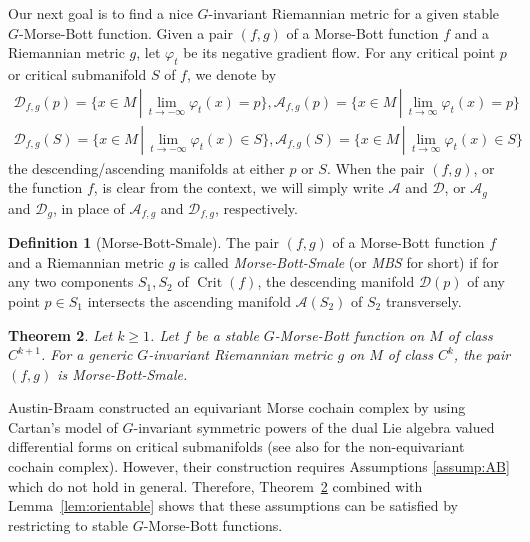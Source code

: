 \documentclass[11pt]{amsart}
\newtheorem{theorem}{Theorem}[section]
\theoremstyle{definition}
\newtheorem{definition}[theorem]{Definition}
\numberwithin{equation}{subsection}
\DeclareMathOperator{\crit}{Crit}
\newcommand{\des}{\mathscr{D}}
\newcommand{\asc}{\mathscr{A}}
\begin{document}
Our next goal is to find a nice $G$-invariant Riemannian metric for a given stable $G$-Morse-Bott function. Given a pair $(f,g)$ of a Morse-Bott function $f$ and a Riemannian metric $g$, let $\varphi_t$ be its negative gradient flow. For any critical point $p$ or critical submanifold $S$ of $f$, we denote by
\begin{align*}
    \des_{f,g}(p)=\{x\in M\,|\,\lim_{t\rightarrow-\infty}\varphi_t(x)=p\},\asc_{f,g}(p)=\{x\in M\,|\,\lim_{t\rightarrow\infty}\varphi_t(x)=p\}\\
     \des_{f,g}(S)=\{x\in M\,|\,\lim_{t\rightarrow-\infty}\varphi_t(x)\in S\}, \asc_{f,g}(S)=\{x\in M\,|\,\lim_{t\rightarrow\infty}\varphi_t(x)\in S\}
\end{align*}
the descending/ascending manifolds at either $p$ or $S$. When the pair $(f,g)$, or the function $f$, is clear from the context, we will simply write $\asc$ and $\des$, or $\asc_g$ and $\des_g$, in place of $\asc_{f,g}$ and $\des_{f,g}$, respectively.



\begin{definition}[Morse-Bott-Smale]\label{def:MBS}
    The pair $(f,g)$ of a Morse-Bott function $f$ and a Riemannian metric $g$ is called \emph{Morse-Bott-Smale} (or  \emph{MBS} for short) if for any two components $S_1,S_2$ of $\crit(f)$, the descending manifold $\des(p)$ of any point $p\in S_1$ intersects the ascending manifold $\asc(S_2)$ of $S_2$ transversely.
\end{definition}

\begin{theorem}\label{thm:Morse-Bott-Smale-is-generic}
    Let $k \geq 1$. Let $f$ be a stable $G$-Morse-Bott function on $M$ of class $C^{k+1}$. 
    For a generic $G$-invariant Riemannian metric $g$ on $M$ of class $C^k$, the pair $(f,g)$ is Morse-Bott-Smale.
\end{theorem}

Austin-Braam \cite{AustinBraam} constructed an equivariant Morse cochain complex by using Cartan's model of $G$-invariant symmetric powers of the dual Lie algebra valued differential forms on critical submanifolds (see also \cite{zhuang2025analytictopologicalrealizationsinvariant} for the non-equivariant cochain complex). However, their construction requires Assumptions \ref{assump:AB} which do not hold in general. Therefore, Theorem~\ref{thm:Morse-Bott-Smale-is-generic} combined with Lemma~\ref{lem:orientable} shows that these assumptions can be satisfied by restricting to stable $G$-Morse-Bott functions.
\end{document}
